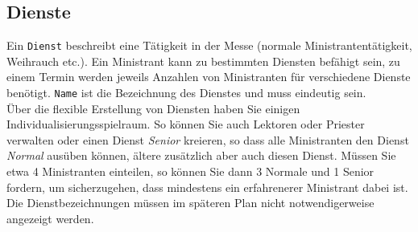 \documentclass[a4paper,11pt]{article}
\begin{document}
\subsection{Dienste}
Ein \texttt{Dienst} beschreibt eine Tätigkeit in der Messe (normale Ministrantentätigkeit, Weihrauch etc.). Ein Ministrant kann zu bestimmten Diensten befähigt sein, zu einem Termin werden jeweils Anzahlen von Ministranten für verschiedene Dienste benötigt. \texttt{Name} ist die Bezeichnung des Dienstes und muss eindeutig sein.\\
Über die flexible Erstellung von Diensten haben Sie einigen Individualisierungsspielraum. So können Sie auch Lektoren oder Priester verwalten oder einen Dienst \textit{Senior} kreieren, so dass alle Ministranten den Dienst \textit{Normal} ausüben können, ältere zusätzlich aber auch diesen Dienst. Müssen Sie etwa 4 Ministranten einteilen, so können Sie dann 3 Normale und 1 Senior fordern, um sicherzugehen, dass mindestens ein erfahrenerer Ministrant dabei ist. Die Dienstbezeichnungen müssen im späteren Plan nicht notwendigerweise angezeigt werden.
\end{document}
